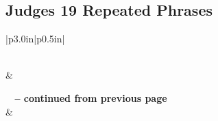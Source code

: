 \subsection{Judges 19 Repeated Phrases}


\normalsize
 
\begin{center}
\begin{longtable}{|p{3.0in}|p{0.5in}|}
\caption[Judges 19 Repeated Phrases]{Judges 19 Repeated Phrases}\label{table:Repeated Phrases Judges 19} \\
\hline {} &  \\ \hline 
\endfirsthead
 
{{\bfseries \tablename\ \thetable{} -- continued from previous page}} \\  
\hline {} &  \\ \hline 
\endhead
 

\end{longtable}
\end{center}
